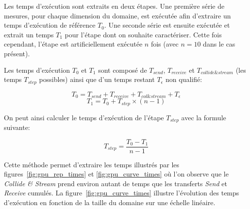 Les temps d'exécution sont extraits en deux étapes. Une première série de mesures, pour chaque dimension du domaine, est exécutée afin d'extraire un temps d'exécution de référence $T_{0}$. Une seconde série est ensuite exécutée et extrait un temps $T_{1}$ pour l'étape dont on souhaite caractériser. Cette fois cependant, l'étape est artificiellement exécutée $n$ fois (avec $n=10$ dans le cas présent). 

Les temps d'exécution $T_{0}$ et $T_{1}$ sont composé de $T_{send}$, $T_{receive}$ et $T_{collide \& stream}$ (les temps $T_{step}$ possibles) ainsi que d'un temps restant $T_{\epsilon}$ non qualifié:

\begin{equation}
T_{0} = T_{send} + T_{receive} + T_{col \& stream} + T_{\epsilon}
\end{equation}
\begin{equation}
T_{1} = T_{0} + T_{step} \times (n-1)
\end{equation}

\noindent On peut ainsi calculer le temps d'exécution de l'étape $T_{step}$  avec la formule suivante:

\begin{equation}
T_{step} = \frac{T_{0} - T_{1}}{n-1}
\end{equation}

Cette méthode permet d'extraire les temps illustrés par les figures~\ref{fig:gpu_rep_times} et \ref{fig:gpu_curve_times} où l'on observe que le \textit{Collide \& Stream} prend environ autant de temps que les transferts \textit{Send} et \textit{Receive} cumulés. La figure~\ref{fig:gpu_curve_times} illustre l'évolution des temps d'exécution en fonction de la taille du domaine sur une échelle linéaire.

